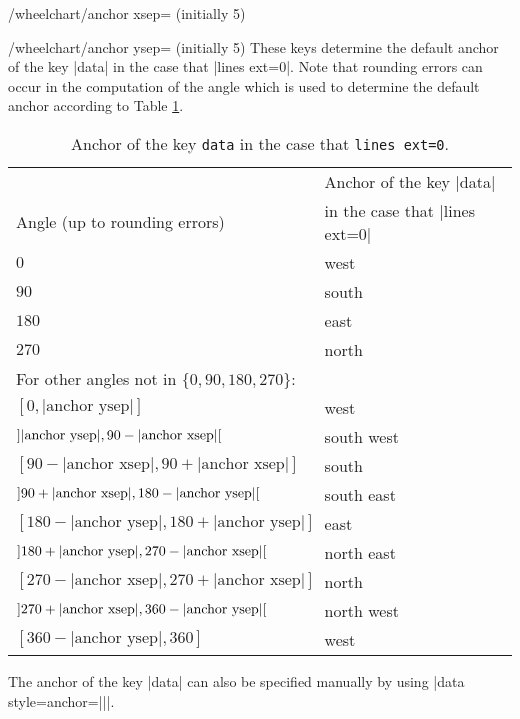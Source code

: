 \documentclass[a4paper,english,dvipsnames]{ltxdoc}
\begin{document}
\begin{key}{/wheelchart/anchor xsep= (initially 5)}
\end{key}
\begin{key}{/wheelchart/anchor ysep= (initially 5)}
These keys determine the default anchor of the key |data| in the case that |lines ext=0|. Note that rounding errors can occur in the computation of the angle which is used to determine the default anchor according to Table \ref{tableanchorofthekeydatainthecasethatlinesextequaltozero}.
\begin{table}[ht]
\centering
\begin{tabular}{ll}
 & Anchor of the key |data|\\
Angle (up to rounding errors) & in the case that |lines ext=0|\\\hline
$0$ & west\\
$90$ & south\\
$180$ & east\\
$270$ & north\\
For other angles not in $\{0,90,180,270\}$: & \\
$[0,\text{|anchor ysep|}]$ & west\\
$\ointerval{\text{|anchor ysep|}}{90-\text{|anchor xsep|}}$ & south west\\
$[90-\text{|anchor xsep|},90+\text{|anchor xsep|}]$ & south\\
$\ointerval{90+\text{|anchor xsep|}}{180-\text{|anchor ysep|}}$ & south east\\
$[180-\text{|anchor ysep|},180+\text{|anchor ysep|}]$ & east\\
$\ointerval{180+\text{|anchor ysep|}}{270-\text{|anchor xsep|}}$ & north east\\
$[270-\text{|anchor xsep|},270+\text{|anchor xsep|}]$ & north\\
$\ointerval{270+\text{|anchor xsep|}}{360-\text{|anchor ysep|}}$ & north west\\
$[360-\text{|anchor ysep|},360]$ & west\\
\end{tabular}
\caption{Anchor of the key \texttt{data} in the case that \texttt{lines ext=0}.}\label{tableanchorofthekeydatainthecasethatlinesextequaltozero}
\end{table}
\begin{codeexample}[width=10cm,preamble={\usepackage{siunitx}}]
\end{codeexample}
The anchor of the key |data| can also be specified manually by using |data style={anchor=||}|.
\end{key}
\end{document}
